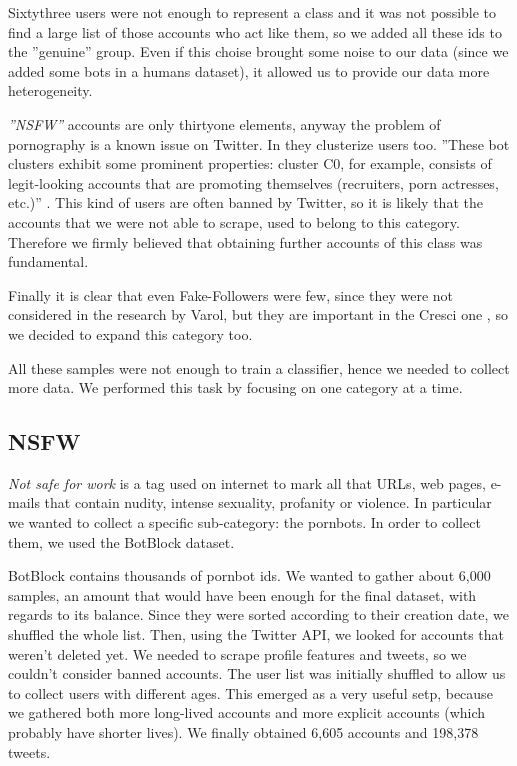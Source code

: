 Sixtythree users were not enough to represent a class and it was not possible to find a large list of those accounts who act like them, so we added all these ids to the ''genuine'' group. Even if this choise brought some noise to our data (since we added some bots in a humans dataset), it allowed us to provide our data more heterogeneity.

\emph{''NSFW''} accounts are only thirtyone elements, anyway the problem of pornography is a known issue on Twitter. In \cite{Varol} they clusterize users too. ''These bot clusters exhibit some prominent properties: cluster C0, for example, consists of legit-looking accounts that are promoting themselves (recruiters, porn actresses, etc.)'' \cite{Varol}.
This kind of users are often banned by Twitter, so it is likely that the accounts that we were not able to scrape, used to belong to this category.
Therefore we firmly believed that obtaining further accounts of this class was fundamental.

Finally it is clear that even Fake-Followers were few, since they were not considered in the research by Varol, but they are important in the Cresci one \cite{Cresci}, so we decided to expand this category too.

All these samples were not enough to train a classifier, hence we needed to collect more data. We performed this task by focusing on one category at a time.

\subsection{NSFW}
\emph{Not safe for work} is a tag used on internet to mark all that URLs, web pages, e-mails that contain nudity, intense sexuality, profanity or violence. In particular we wanted to collect a specific sub-category: the pornbots. In order to collect them, we used the BotBlock dataset.

BotBlock contains thousands of pornbot ids. We wanted to gather about 6,000 samples, an amount that would have been enough for the final dataset, with regards to its balance.
Since they were sorted according to their creation date, we shuffled the whole list. Then, using the Twitter API, we looked for accounts that weren't deleted yet. 
We needed to scrape profile features and tweets, so we couldn't consider banned accounts. The user list was initially shuffled to allow us to collect users with different ages. This emerged as a very useful setp, because we gathered both more long-lived accounts and more explicit accounts (which probably have shorter lives). We finally obtained 6,605 accounts and 198,378 tweets.
